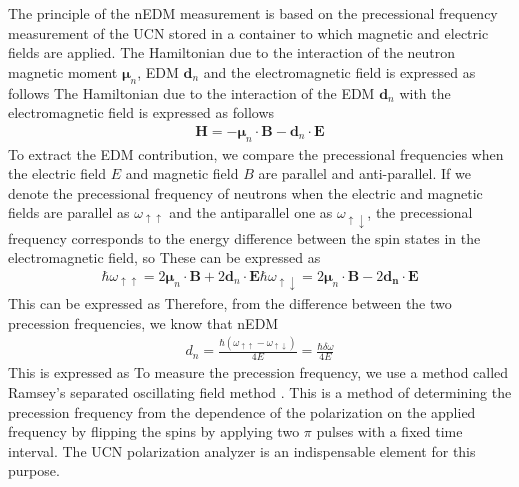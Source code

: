 \documentclass{jps-cp}
\begin{document}
The principle of the nEDM measurement is based on the precessional frequency measurement of the UCN stored in a container to which magnetic and electric fields are applied. The Hamiltonian due to the interaction of the neutron magnetic moment $\boldsymbol \mu_n$, EDM $\boldsymbol d_n$ and the electromagnetic field is expressed as follows
The Hamiltonian due to the interaction of the EDM $\boldsymbol d_n$ with the electromagnetic field is expressed as follows
\begin{align}
\boldsymbol H =-\boldsymbol \mu_n \cdot \boldsymbol B-\boldsymbol d_n\cdot \boldsymbol E
\end{align}
To extract the EDM contribution, we compare the precessional frequencies when the electric field $E$ and magnetic field $B$ are parallel and anti-parallel. If we denote the precessional frequency of neutrons when the electric and magnetic fields are parallel as $\omega_{\uparrow\uparrow}$ and the antiparallel one as $\omega_{\uparrow\downarrow}$, the precessional frequency corresponds to the energy difference between the spin states in the electromagnetic field, so These can be expressed as
\begin {align}
\hbar\omega_{\uparrow\uparrow} = 2\boldsymbol \mu_n\cdot \boldsymbol B+2 \boldsymbol d_n\cdot \boldsymbol E\boldsymbol
\hbar \omega_{\uparrow\downarrow} = 2\boldsymbol \mu_n \cdot \boldsymbol B-2 \boldsymbol {d_n}\cdot \boldsymbol E
\end{align}
This can be expressed as Therefore, from the difference between the two precession frequencies, we know that nEDM
\begin {align}
    d_n=\frac{\hbar(\omega_{\uparrow\uparrow}-\omega_{\uparrow\downarrow})}{4E}=\frac{\hbar\delta\omega}{4E}
\end{align}
This is expressed as To measure the precession frequency, we use a method called Ramsey's separated oscillating field method \cite{Ramsey}. This is a method of determining the precession frequency from the dependence of the polarization on the applied frequency by flipping the spins by applying two $\pi$ pulses with a fixed time interval. The UCN polarization analyzer is an indispensable element for this purpose.
\end{document}
